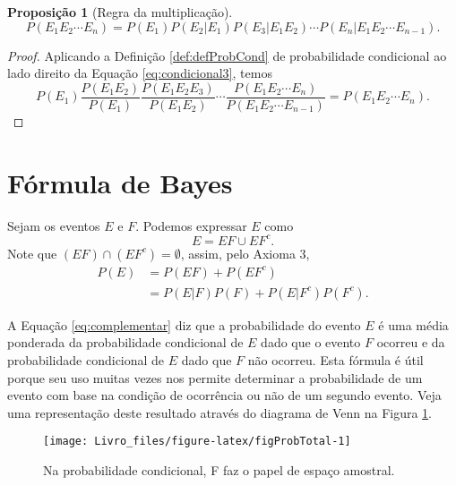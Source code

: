 \documentclass[]{book}
\newtheorem{proposition}{Proposição}[chapter]
\theoremstyle{definition}
\theoremstyle{definition}
\theoremstyle{definition}
\theoremstyle{remark}
\begin{document}
\begin{proposition}[Regra da multiplicação]
\protect\hypertarget{prp:unnamed-chunk-152}{}{\label{prp:unnamed-chunk-152} \iffalse (Regra da multiplicação) \fi{} }\begin{equation}
P(E_1 E_2 \cdots E_n) = P(E_1)P(E_2|E_1)P(E_3|E_1 E_2)\cdots P(E_n|E_1 E_2 \cdots E_{n-1}).

\label{eq:condicional3}
\end{equation}
\end{proposition}

\begin{proof}
\iffalse{} {Prova. } \fi{}Aplicando a Definição \ref{def:defProbCond} de probabilidade condicional ao lado direito da Equação \eqref{eq:condicional3}, temos
\[P(E_1) \frac{P(E_1E_2)}{P(E_1)} \frac{P(E_1 E_2 E_3)}{P(E_1 E_2)} \cdots \frac{P(E_1 E_2 \cdots E_n)}{P(E_1 E_2 \cdots E_{n-1})} = P(E_1 E_2 \cdots E_n).\]
\end{proof}

\hypertarget{fuxf3rmula-de-bayes}{%
\section{Fórmula de Bayes}\label{fuxf3rmula-de-bayes}}

Sejam os eventos \(E\) e \(F\).
Podemos expressar \(E\) como
\[E = EF \cup EF^c.\]
Note que \((EF) \cap (EF^c)=\emptyset\), assim, pelo Axioma 3,
\begin{align}
P(E) &= P(EF) + P(EF^c)\\
&= P(E|F)P(F) + P(E|F^c)P(F^c).
\label{eq:complementar}
\end{align}

A Equação \eqref{eq:complementar} diz que a probabilidade do evento \(E\) é uma média ponderada da probabilidade condicional de \(E\) dado que o evento \(F\) ocorreu e da probabilidade condicional de \(E\) dado que \(F\) não ocorreu.
Esta fórmula é útil porque seu uso muitas vezes nos permite determinar a probabilidade de um evento com base na condição de ocorrência ou não de um segundo evento.
Veja uma representação deste resultado através do diagrama de Venn na Figura \ref{fig:figProbTotal}.

\begin{figure}

{\centering \texttt{[image: Livro\_files/figure-latex/figProbTotal-1]} 

}

\caption{Na probabilidade condicional, F faz o papel de espaço amostral.}\label{fig:figProbTotal}
\end{figure}
\end{document}
